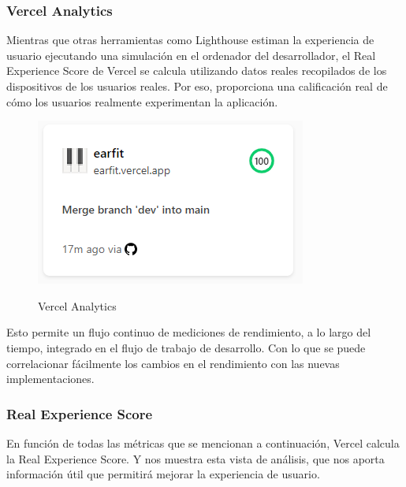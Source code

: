 \documentclass[12pt,twoside,titlepage]{report}
\begin{document}
\subsubsection{Vercel Analytics}

Mientras que otras herramientas como Lighthouse estiman la experiencia de usuario ejecutando una simulación en el ordenador del desarrollador, el Real Experience Score de Vercel se calcula utilizando datos reales recopilados de los dispositivos de los usuarios reales. Por eso, proporciona una calificación real de cómo los usuarios realmente experimentan la aplicación.

\begin{figure}[H]
    \centering
    \includegraphics[scale=0.8]{Vercel/VercelAnalyticsResume}
    \label{fig:Vercel_metrics_resume}
    \caption{Vercel Analytics}
\end{figure}

Esto permite un flujo continuo de mediciones de rendimiento, a lo largo del tiempo, integrado en el flujo de trabajo de desarrollo. Con lo que se puede correlacionar fácilmente los cambios en el rendimiento con las nuevas implementaciones.

\subsubsection{Real Experience Score}

En función de todas las métricas que se mencionan a continuación, Vercel calcula la Real Experience Score. Y nos muestra esta vista de análisis, que nos aporta información útil que permitirá mejorar la experiencia de usuario.
\end{document}
